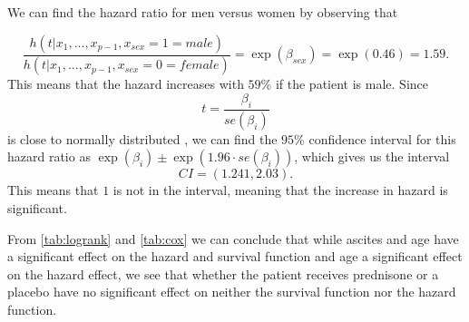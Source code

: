 \documentclass[a4paper,norsk, 10pt]{article}
\begin{document}
We can find the hazard ratio for men versus women by observing that

\begin{equation}
\frac{h(t|x_1,...,x_{p-1},x_{sex} = 1 = male)}{h(t|x_1,...,x_{p-1},x_{sex} = 0 = female)} = \exp(\beta_{sex}) = \exp(0.46) = 1.59.
\end{equation}
This means that the hazard increases with $59\%$ if the patient is male. Since
\begin{equation}
t = \frac{\beta_i}{se(\beta_i)}
\end{equation}
is close to normally distributed , we can find the $95\%$ confidence interval for this hazard ratio as $\exp(\beta_i) \pm \exp(1.96\cdot se(\beta_i))$, which gives us the interval
\begin{equation}
CI = (1.241,2.03).
\end{equation}
This means that $1$ is not in the interval, meaning that the increase in hazard is significant.

From \ref{tab:logrank} and \ref{tab:cox} we can conclude that while ascites and age have a significant effect on the hazard and survival function and age a significant effect on the hazard effect, we see that whether the patient receives prednisone or a placebo have no significant effect on neither the survival function nor the hazard function.
\end{document}
